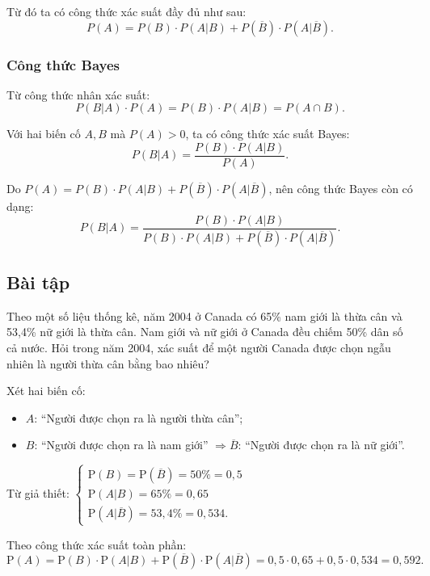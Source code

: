 \documentclass[twoside,final]{hcmut-report}
\newcommand{\exercise}[1]{\begin{exercisebox}#1\end{exercisebox}}
\begin{document}
Từ đó ta có công thức xác suất đầy đủ như sau:
\[
    P(A) = P(B) \cdot P(A | B) + P(\overline{B}) \cdot P(A | \overline{B}).
\]
\subsubsection{Công thức Bayes}
Từ công thức nhân xác suất:
\[
    P(B | A) \cdot P(A) = P(B) \cdot P(A | B) = P(A \cap B).
\]

Với hai biến cố $A, B$ mà $P(A) > 0$, ta có công thức xác suất Bayes:
\[
    P(B | A) = \frac{P(B) \cdot P(A | B)}{P(A)}.
\]

Do \(P(A) = P(B) \cdot P(A | B) + P(\overline{B}) \cdot P(A | \overline{B})\), nên công thức Bayes còn có dạng:
\[
    P(B | A) = \frac{P(B) \cdot P(A | B)}{P(B) \cdot P(A | B) + P(\overline{B}) \cdot P(A | \overline{B})}.
\]
\subsection{Bài tập}
\exercise{Theo một số liệu thống kê, năm 2004 ở Canada có 65\% nam giới là thừa cân và 53,4\% nữ giới là thừa cân. Nam giới và nữ giới ở Canada đều chiếm 50\% dân số cả nước. Hỏi trong năm 2004, xác suất để một người Canada được chọn ngẫu nhiên là người thừa cân bằng bao nhiêu?}

Xét hai biến cố:
\begin{itemize}[itemsep=0pt, topsep=0pt, parsep=0pt,label=-]
    \item $A$: ``Người được chọn ra là người thừa cân'';
    \item $B$: ``Người được chọn ra là nam giới'' $\Rightarrow\overline{B}$: ``Người được chọn ra là nữ giới''.
\end{itemize}

Từ giả thiết:
$\begin{cases}
        \mathrm{P}(B) = \mathrm{P}(\overline{B}) = 50\% = 0{,}5 \\
        \mathrm{P}(A | B) = 65\% = 0{,}65                       \\
        \mathrm{P}(A | \overline{B}) = 53{,}4\% = 0{,}534.
    \end{cases}$

Theo công thức xác suất toàn phần:
\[
    \mathrm{P}(A) = \mathrm{P}(B) \cdot \mathrm{P}(A | B) + \mathrm{P}(\overline{B}) \cdot \mathrm{P}(A | \overline{B})
    = 0{,}5 \cdot 0{,}65 + 0{,}5 \cdot 0{,}534 = 0{,}592.
\]
\end{document}
